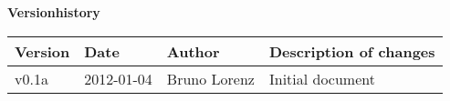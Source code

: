 \noindent \textbf{\Large Versionhistory}\\

\newcommand{\versionrow}[4]{
    \small #1 &
    \small #2 &
    \small #3 &
    \small #4 \\
}


\begin{table}[h]
    \begin{tabular*}{\textwidth}{l:l:l:l}
        \hline
        \versionrow{\textbf{Version}}{\textbf{Date}}{\textbf{Author}}{\textbf{Description of changes}}
        \hline
        \versionrow{v0.1a}{2012-01-04}{Bruno Lorenz}{Initial document}
        \hline
    \end{tabular*}
\end{table}

